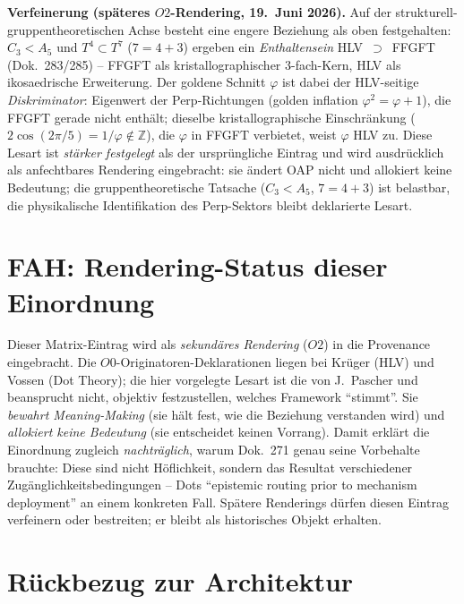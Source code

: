 \medskip\noindent\textbf{Verfeinerung (sp\"ateres $O2$-Rendering, 19.~Juni 2026).} Auf der strukturell-gruppentheoretischen Achse besteht eine engere Beziehung als oben festgehalten: $C_3<A_5$ und $T^4\subset T^7$ ($7=4+3$) ergeben ein \emph{Enthaltensein} HLV~$\supset$~FFGFT (Dok.~283/285) -- FFGFT als kristallographischer $3$-fach-Kern, HLV als ikosaedrische Erweiterung. Der goldene Schnitt $\varphi$ ist dabei der HLV-seitige \emph{Diskriminator}: Eigenwert der Perp-Richtungen (golden inflation $\varphi^2=\varphi+1$), die FFGFT gerade nicht enth\"alt; dieselbe kristallographische Einschr\"ankung ($2\cos(2\pi/5)=1/\varphi\notin\mathbb{Z}$), die $\varphi$ in FFGFT verbietet, weist $\varphi$ HLV zu. Diese Lesart ist \emph{st\"arker festgelegt} als der urspr\"ungliche Eintrag und wird ausdr\"ucklich als anfechtbares Rendering eingebracht: sie \"andert OAP nicht und allokiert keine Bedeutung; die gruppentheoretische Tatsache ($C_3<A_5$, $7=4+3$) ist belastbar, die physikalische Identifikation des Perp-Sektors bleibt deklarierte Lesart.

\section{FAH: Rendering-Status dieser Einordnung}

Dieser Matrix-Eintrag wird als \emph{sekundäres Rendering} ($O2$) in die Provenance eingebracht. Die
$O0$-Originatoren-Deklarationen liegen bei Krüger (HLV) und Vossen (Dot Theory); die hier vorgelegte Lesart
ist die von J.~Pascher und beansprucht nicht, objektiv festzustellen, welches Framework \enquote{stimmt}.
Sie \emph{bewahrt Meaning-Making} (sie hält fest, wie die Beziehung verstanden wird) und \emph{allokiert
keine Bedeutung} (sie entscheidet keinen Vorrang). Damit erklärt die Einordnung zugleich \emph{nachträglich},
warum Dok.~271 genau seine Vorbehalte brauchte: Diese sind nicht Höflichkeit, sondern das Resultat
verschiedener Zugänglichkeitsbedingungen -- Dots \enquote{epistemic routing prior to mechanism deployment}
an einem konkreten Fall. Spätere Renderings dürfen diesen Eintrag verfeinern oder bestreiten; er bleibt als
historisches Objekt erhalten.

\section{Rückbezug zur Architektur}

